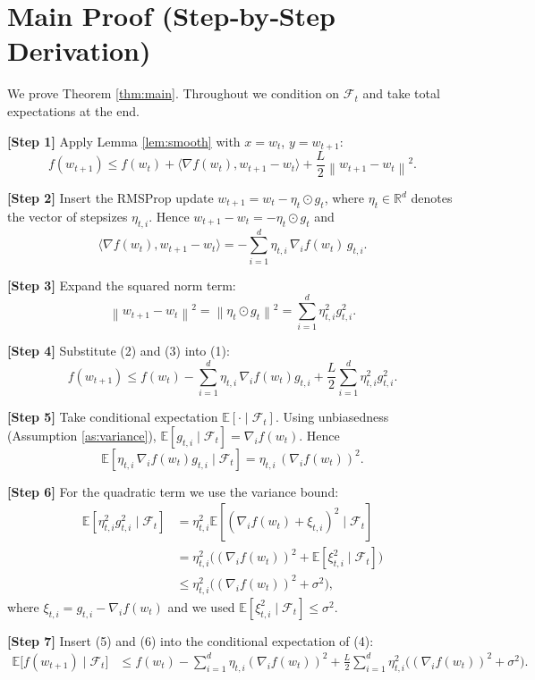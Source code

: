\documentclass{article}
\newcommand{\E}{\mathbb{E}}
\newcommand{\R}{\mathbb{R}}
\newcommand{\norm}[1]{\left\lVert #1\right\rVert}
\begin{document}
\section*{Main Proof (Step‑by‑Step Derivation)}
We prove Theorem \ref{thm:main}.  Throughout we condition on $\mathcal F_t$ and take total
expectations at the end.

\noindent\textbf{[Step 1]} Apply Lemma \ref{lem:smooth} with $x=w_t$, $y=w_{t+1}$:
\[
f(w_{t+1})\le f(w_t)+\langle\nabla f(w_t),w_{t+1}-w_t\rangle
            +\frac{L}{2}\norm{w_{t+1}-w_t}^2 .
\tag{1}
\]

\noindent\textbf{[Step 2]} Insert the RMSProp update $w_{t+1}=w_t-\eta_t\odot g_t$,
where $\eta_t\in\R^d$ denotes the vector of stepsizes $\eta_{t,i}$.
Hence $w_{t+1}-w_t=-\eta_t\odot g_t$ and
\[
\langle\nabla f(w_t),w_{t+1}-w_t\rangle
= -\sum_{i=1}^d \eta_{t,i}\, \nabla_i f(w_t)\, g_{t,i}.
\tag{2}
\]

\noindent\textbf{[Step 3]} Expand the squared norm term:
\[
\norm{w_{t+1}-w_t}^2 = \norm{\eta_t\odot g_t}^2
= \sum_{i=1}^d \eta_{t,i}^2 g_{t,i}^2 .
\tag{3}
\]

\noindent\textbf{[Step 4]} Substitute (2) and (3) into (1):
\[
f(w_{t+1})\le f(w_t)
      -\sum_{i=1}^d \eta_{t,i}\,\nabla_i f(w_t) g_{t,i}
      +\frac{L}{2}\sum_{i=1}^d \eta_{t,i}^2 g_{t,i}^2 .
\tag{4}
\]

\noindent\textbf{[Step 5]} Take conditional expectation $\E[\cdot\mid\mathcal F_t]$.
Using unbiasedness (Assumption \ref{as:variance}),
$\E[g_{t,i}\mid\mathcal F_t]=\nabla_i f(w_t)$.  Hence
\[
\E\!\left[\eta_{t,i}\,\nabla_i f(w_t) g_{t,i}\mid\mathcal F_t\right]
= \eta_{t,i}\,(\nabla_i f(w_t))^2 .
\tag{5}
\]

\noindent\textbf{[Step 6]} For the quadratic term we use the variance bound:
\[
\begin{aligned}
\E\!\left[\eta_{t,i}^2 g_{t,i}^2\mid\mathcal F_t\right]
&= \eta_{t,i}^2 \E\!\left[(\nabla_i f(w_t)+\xi_{t,i})^2\mid\mathcal F_t\right] \\
&= \eta_{t,i}^2\Big((\nabla_i f(w_t))^2+\E[\xi_{t,i}^2\mid\mathcal F_t]\Big)\\
&\le \eta_{t,i}^2\Big((\nabla_i f(w_t))^2+\sigma^2\Big),
\end{aligned}
\tag{6}
\]
where $\xi_{t,i}=g_{t,i}-\nabla_i f(w_t)$ and we used $\E[\xi_{t,i}^2\mid\mathcal F_t]\le\sigma^2$.

\noindent\textbf{[Step 7]} Insert (5) and (6) into the conditional expectation of (4):
\[
\begin{aligned}
\E\!\big[f(w_{t+1})\mid\mathcal F_t\big]
&\le f(w_t)
   -\sum_{i=1}^d \eta_{t,i}(\nabla_i f(w_t))^2
   +\frac{L}{2}\sum_{i=1}^d \eta_{t,i}^2\big((\nabla_i f(w_t))^2+\sigma^2\big) .
\end{aligned}
\tag{7}
\]
\end{document}
